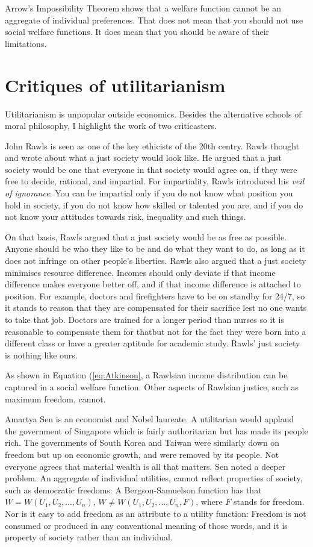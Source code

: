 Arrow's Impossibility Theorem shows that a welfare function cannot be an aggregate of individual preferences. That does not mean that you should not use social welfare functions. It does mean that you should be aware of their limitations.

\section{Critiques of utilitarianism}
Utilitarianism is unpopular outside economics. Besides the alternative schools of moral philosophy, I highlight the work of two criticasters.

John Rawls is seen as one of the key ethicists of the 20th centry. Rawls thought and wrote about what a just society would look like. He argued that a just society would be one that everyone in that society would agree on, if they were free to decide, rational, and impartial. For impartiality, Rawls introduced his \emph{veil of ignorance}: You can be impartial only if you do not know what position you hold in society, if you do not know how skilled or talented you are, and if you do not know your attitudes towards risk, inequality and such things.

On that basis, Rawls argued that a just society would be as free as possible. Anyone should be who they like to be and do what they want to do, as long as it does not infringe on other people's liberties. Rawls also argued that a just society minimises resource difference. Incomes should only deviate if that income difference makes everyone better off, and if that income difference is attached to position. For example, doctors and firefighters have to be on standby for 24/7, so it stands to reason that they are compensated for their sacrifice lest no one wants to take that job. Doctors are trained for a longer period than nurses so it is reasonable to compensate them for that\textemdash but not for the fact they were born into a different class or have a greater aptitude for academic study. Rawls' just society is nothing like ours.

As shown in Equation (\ref{eq:Atkinson}, a Rawlsian income distribution can be captured in a social welfare function. Other aspects of Rawlsian justice, such as maximum freedom, cannot.

Amartya Sen is an economist and Nobel laureate. A utilitarian would applaud the government of Singapore which is fairly authoritarian but has made its people rich. The governments of South Korea and Taiwan were similarly down on freedom but up on economic growth, and were removed by its people. Not everyone agrees that material wealth is all that matters. Sen noted a deeper problem. An aggregate of individual utilities, cannot reflect properties of society, such as democratic freedoms: A Bergson-Samuelson function has that $W=W(U_1, U_2, ..., U_n)$, $W \neq W(U_1, U_2, ..., U_n, F)$, where $F$ stands for freedom. Nor is it easy to add freedom as an attribute to a utility function: Freedom is not consumed or produced in any conventional meaning of those words, and it is property of society rather than an individual.

